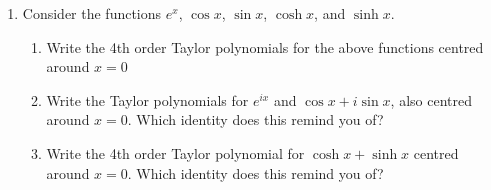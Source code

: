 \begin{enumerate}
				\item Consider the functions $e^x$, $\cos{x}$, $\sin{x}$, $\cosh{x}$, and $\sinh{x}$.
                \begin{enumerate}
                    \item Write the 4th order Taylor polynomials for the above functions centred around $x=0$
                    \item Write the Taylor polynomials for $e^{ix}$ and $\cos{x} + i\sin{x}$, also centred around $x=0$. Which identity does this remind you of?
                    \item Write the 4th order Taylor polynomial for $\cosh{x} + \sinh{x}$ centred around $x=0$. Which identity does this remind you of?
                \end{enumerate}
		\end{enumerate}
